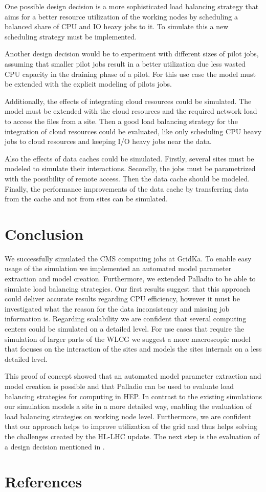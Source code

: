 \documentclass[a4paper]{jpconf}
\begin{document}
One possible design decision is a more sophisticated load balancing strategy that aims for a better resource utilization of the working nodes by scheduling a balanced share of CPU and IO heavy jobs to it. To simulate this a new scheduling strategy must be implemented.

Another design decision would be to experiment with different sizes of pilot jobs, assuming that smaller pilot jobs result in a better utilization due less wasted CPU capacity in the draining phase of a pilot. For this use case the model must be extended with the explicit modeling of pilots jobs.

Additionally, the effects of integrating cloud resources could be simulated. The model must be extended with the cloud resources and the required network load to access the files from a site. Then a good load balancing strategy for the  integration of cloud resources could be evaluated, like only scheduling CPU heavy jobs to cloud resources and keeping I/O heavy jobs near the data.

Also the effects of data caches could be simulated. Firstly, several sites must be modeled to simulate their interactions. Secondly, the jobs must be parametrized with the possibility of remote access. Then the data cache should be modeled. Finally, the performance improvements of the data cache by transferring data from the cache and not from sites can be simulated.
\section{Conclusion}
\label{conlusion}
We successfully simulated the CMS computing jobs at GridKa. To enable easy usage of the simulation we implemented an automated model parameter extraction and model creation. Furthermore, we extended Palladio to be able to simulate load balancing strategies. Our first results suggest that this approach could deliver accurate results regarding CPU efficiency, however it must be investigated what the reason for the data inconsistency and missing job information is. Regarding scalability we are confident that several computing centers could be simulated on a detailed level. For use cases that require the simulation of larger parts of the WLCG we suggest a more macroscopic model that focuses on the interaction of the sites and models the sites internals on a less detailed level.

This proof of concept showed that an automated model parameter extraction and model creation is possible and that Palladio can be used to evaluate load balancing strategies for computing in HEP. In contrast to the existing simulations our simulation models a site in a more detailed way, enabling the evaluation of load balancing strategies on working node level. Furthermore, we are confident that our approach helps to improve utilization of the grid and thus helps solving the challenges created by the HL-LHC update. The next step is the evaluation of a design decision mentioned in .

\section*{References}

\end{document}
